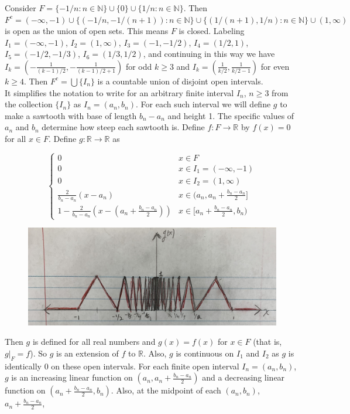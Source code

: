 \documentclass[a4paper]{article}
\begin{document}
Consider $F = \{-1/n : n \in \mathbb{N}\}\cup \{0\} \cup \{1/n : n \in \mathbb{N}\}$. Then $F^c = (-\infty, -1)\cup \{(-1/n, -1/(n+1)) : n \in \mathbb{N}\} \cup \{(1/(n+1), 1/n) : n \in \mathbb{N}\}\cup (1,\infty)$ is open as the union of open sets. This means $F$ is closed. Labeling $I_1 = (-\infty,-1)$, $I_2 = (1,\infty)$, $I_3 = (-1,-1/2)$, $I_4 = (1/2,1)$, $I_5 = (-1/2,-1/3)$, $I_6 = (1/3,1/2)$, and continuing in this way we have $I_k = \left(-\frac{1}{(k-1)/2}, -\frac{1}{(k-1)/2 + 1}\right)$ for odd $k \geq 3$ and $I_k = \left(\frac{1}{k/2}, \frac{1}{k/2 - 1}\right)$ for even $k \geq 4$. Then $F^c = \bigcup \{I_n\}$ is a countable union of disjoint open intervals. \\

It simplifies the notation to write for an arbitrary finite interval $I_n$, $n\geq 3$ from the collection $\{I_n\}$ as $I_n = (a_n,b_n)$. For each such interval we will define $g$ to make a sawtooth with base of length $b_n-a_n$ and height 1. The specific values of $a_n$ and $b_n$ determine how steep each sawtooth is. Define $f:F\rightarrow \mathbb{R}$ by $f(x) = 0$ for all $x \in F$. Define $g: \mathbb{R}\rightarrow \mathbb{R}$ as

$$\begin{cases}
0 & x \in F\\
0 & x \in I_1 = (-\infty, -1)\\
0 & x \in I_2 = (1,\infty)\\
\frac{2}{b_n-a_n}(x-a_n) & x \in (a_n,a_n + \frac{b_n-a_n}{2}]\\
1 - \frac{2}{b_n - a_n}\left(x- (a_n + \frac{b_n-a_n}{2})\right) & x \in [a_n + \frac{b_n - a_n}{2}, b_n)
\end{cases}$$

\begin{figure}[H]
\centering
\includegraphics[width = \linewidth]{function_g.jpg}
\label{$g(x)$}
\end{figure}

Then $g$ is defined for all real numbers and $g(x) = f(x)$ for $x \in F$ (that is, $g\rvert_F = f$). So $g$ is an extension of $f$ to $\mathbb{R}$. Also, $g$ is continuous on $I_1$ and $I_2$ as $g$ is identically 0 on these open intervals. For each finite open interval $I_n = (a_n,b_n)$, $g$ is an increasing linear function on $(a_n, a_n + \frac{b_n-a_n}{2})$ and a decreasing linear function on $(a_n +\frac{b_n-a_n}{2}, b_n)$. Also, at the midpoint of each $(a_n,b_n)$, $a_n + \frac{b_n-a_n}{2}$,
\end{document}
